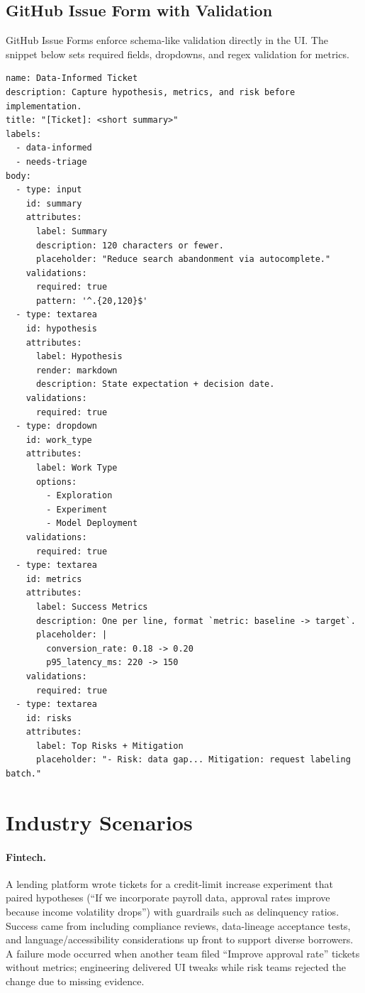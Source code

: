 \subsection{GitHub Issue Form with Validation}
GitHub Issue Forms enforce schema-like validation directly in the UI. The snippet below sets required fields, dropdowns, and regex validation for metrics.

\begin{lstlisting}[caption={Sample GitHub Issue form for data-informed tickets.}]
name: Data-Informed Ticket
description: Capture hypothesis, metrics, and risk before implementation.
title: "[Ticket]: <short summary>"
labels:
  - data-informed
  - needs-triage
body:
  - type: input
    id: summary
    attributes:
      label: Summary
      description: 120 characters or fewer.
      placeholder: "Reduce search abandonment via autocomplete."
    validations:
      required: true
      pattern: '^.{20,120}$'
  - type: textarea
    id: hypothesis
    attributes:
      label: Hypothesis
      render: markdown
      description: State expectation + decision date.
    validations:
      required: true
  - type: dropdown
    id: work_type
    attributes:
      label: Work Type
      options:
        - Exploration
        - Experiment
        - Model Deployment
    validations:
      required: true
  - type: textarea
    id: metrics
    attributes:
      label: Success Metrics
      description: One per line, format `metric: baseline -> target`.
      placeholder: |
        conversion_rate: 0.18 -> 0.20
        p95_latency_ms: 220 -> 150
    validations:
      required: true
  - type: textarea
    id: risks
    attributes:
      label: Top Risks + Mitigation
      placeholder: "- Risk: data gap... Mitigation: request labeling batch."
\end{lstlisting}

\section{Industry Scenarios}
\label{sec:ticket-industry}

\paragraph{Fintech.} A lending platform wrote tickets for a credit-limit increase experiment that paired hypotheses (``If we incorporate payroll data, approval rates improve because income volatility drops'') with guardrails such as delinquency ratios. Success came from including compliance reviews, data-lineage acceptance tests, and language/accessibility considerations up front to support diverse borrowers. A failure mode occurred when another team filed ``Improve approval rate'' tickets without metrics; engineering delivered UI tweaks while risk teams rejected the change due to missing evidence.


